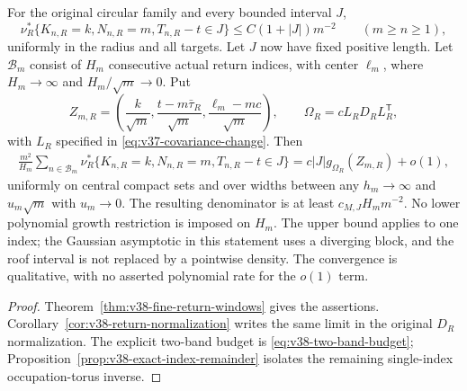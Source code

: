 \begin{leadtheorem}
\label{thm:intro-v38-fine-returns}
For the original circular family and every bounded interval $J$,
\[
 \nu_R^*\{K_{n,R}=k,N_{n,R}=m,T_{n,R}-t\in J\}
       \le C(1+|J|)m^{-2}\qquad(m\ge n\ge1),
\]
uniformly in the radius and all targets. Let $J$ now have fixed positive
length. Let $\mathcal B_m$ consist of $H_m$ consecutive actual return
indices, with center $\ell_m$, where $H_m\to\infty$ and
$H_m/\sqrt m\to0$. Put
\[
 Z_{m,R}=\left(\frac{k}{\sqrt m},
       \frac{t-m\bar\tau_R}{\sqrt m},
       \frac{\ell_m-mc}{\sqrt m}\right),\qquad
 \Omega_R=cL_RD_RL_R^{\mathsf T},
\]
with $L_R$ specified in \eqref{eq:v37-covariance-change}. Then
\begin{align}\label{eq:intro-v38-fine-returns}
 \frac{m^2}{H_m}\sum_{n\in\mathcal B_m}
 \nu_R^*\{K_{n,R}=k,N_{n,R}=m,T_{n,R}-t\in J\}
       =c|J|g_{\Omega_R}(Z_{m,R})+o(1),
\end{align}
uniformly on central compact sets and over widths between any
$h_m\to\infty$ and $u_m\sqrt m$ with $u_m\to0$.
The resulting denominator is at least $c_{M,J}H_mm^{-2}$.
No lower polynomial growth restriction is imposed on $H_m$.
The upper bound applies to one index; the Gaussian asymptotic in this
statement uses a diverging block, and the roof interval is not replaced by a pointwise
density. The convergence is qualitative, with no asserted polynomial
rate for the $o(1)$ term.
\end{leadtheorem}
\begin{proof}
Theorem~\ref{thm:v38-fine-return-windows} gives the assertions.
Corollary~\ref{cor:v38-return-normalization} writes the same limit in
the original $D_R$ normalization. The explicit two-band budget is
\eqref{eq:v38-two-band-budget};
Proposition~\ref{prop:v38-exact-index-remainder} isolates the remaining
single-index occupation-torus inverse.
\end{proof}

